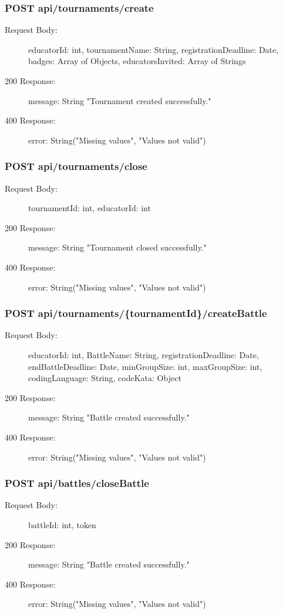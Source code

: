 \documentclass{Configuration_Files/Template}
\begin{document}
\subsubsection{POST api/tournaments/create}
\begin{description}
    \item[Request Body:] educatorId: int, tournamentName: String, registrationDeadline: Date, badges: Array of Objects, educatorsInvited: Array of Strings
    \item[200 Response:] message: String "Tournament created successfully."
    \item[400 Response:] error: String("Missing values", "Values not valid")
\end{description}

\subsubsection{POST api/tournaments/close}
\begin{description}
    \item[Request Body:] tournamentId: int, educatorId: int
    \item[200 Response:] message: String "Tournament closed successfully."
    \item[400 Response:] error: String("Missing values", "Values not valid")
\end{description}

\subsubsection{POST api/tournaments/\{tournamentId\}/createBattle}
\begin{description}
    \item[Request Body:] educatorId: int, BattleName: String, registrationDeadline: Date, endBattleDeadline: Date, minGroupSize: int, maxGroupSize: int, codingLanguage: String, codeKata: Object
    \item[200 Response:] message: String "Battle created successfully."
    \item[400 Response:] error: String("Missing values", "Values not valid")
\end{description}

\subsubsection{POST api/battles/closeBattle}
\begin{description}
    \item[Request Body:] battleId: int, token
    \item[200 Response:] message: String "Battle created successfully."
    \item[400 Response:] error: String("Missing values", "Values not valid")
\end{description}
\end{document}
